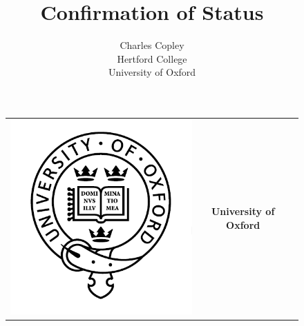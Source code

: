 \documentclass[english,a4paper,titlepage,12pt]{article}
\author{Charles Copley\\Hertford College\\University of Oxford}
\title{Confirmation of Status}
\begin{document}
%
\pagestyle{empty}
\begin{center}

\begin{figure}[ht]
\centering
\begin{tabular}{ccc}
\begin{minipage}{3cm}
\includegraphics[scale=0.25]{./images/logos/OxfordLogo.png}
\end{minipage}
&
\begin{minipage}{9cm}
\centering
\textbf{\large University of Oxford}
\vspace{1 cm}


\end{minipage}
\end{tabular}
\end{figure}
\end{center}
\end{document}

